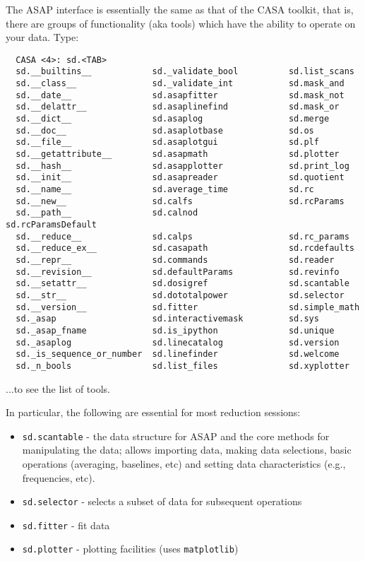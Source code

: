 The ASAP interface is essentially the same as that
of the CASA toolkit, that is, there are groups of functionality (aka
tools) which have the ability to operate on your data. Type:

\small
\begin{verbatim}
  CASA <4>: sd.<TAB>
  sd.__builtins__            sd._validate_bool          sd.list_scans
  sd.__class__               sd._validate_int           sd.mask_and
  sd.__date__                sd.asapfitter              sd.mask_not
  sd.__delattr__             sd.asaplinefind            sd.mask_or
  sd.__dict__                sd.asaplog                 sd.merge
  sd.__doc__                 sd.asaplotbase             sd.os
  sd.__file__                sd.asaplotgui              sd.plf
  sd.__getattribute__        sd.asapmath                sd.plotter
  sd.__hash__                sd.asapplotter             sd.print_log
  sd.__init__                sd.asapreader              sd.quotient
  sd.__name__                sd.average_time            sd.rc
  sd.__new__                 sd.calfs                   sd.rcParams
  sd.__path__                sd.calnod                  sd.rcParamsDefault
  sd.__reduce__              sd.calps                   sd.rc_params
  sd.__reduce_ex__           sd.casapath                sd.rcdefaults
  sd.__repr__                sd.commands                sd.reader
  sd.__revision__            sd.defaultParams           sd.revinfo
  sd.__setattr__             sd.dosigref                sd.scantable
  sd.__str__                 sd.dototalpower            sd.selector
  sd.__version__             sd.fitter                  sd.simple_math
  sd._asap                   sd.interactivemask         sd.sys
  sd._asap_fname             sd.is_ipython              sd.unique
  sd._asaplog                sd.linecatalog             sd.version
  sd._is_sequence_or_number  sd.linefinder              sd.welcome
  sd._n_bools                sd.list_files              sd.xyplotter
\end{verbatim}
\normalsize

...to see the list of tools.

In particular, the following are essential for most reduction
sessions: 
\begin{itemize}
   \item {\tt sd.scantable} - the data structure for ASAP and the core
         methods for manipulating the data; allows importing data,
         making data selections, basic operations (averaging,
         baselines, etc) and setting data characteristics (e.g.,
         frequencies, etc).
   \item {\tt sd.selector} - selects a subset of data for subsequent operations
   \item {\tt sd.fitter} - fit data 
   \item {\tt sd.plotter} - plotting facilities (uses {\tt matplotlib})
\end{itemize}

